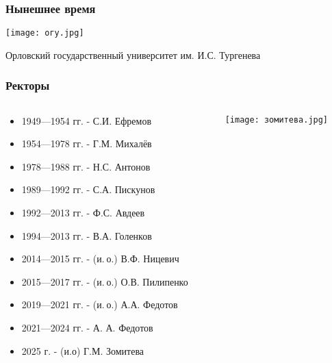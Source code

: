 \documentclass{beamer}
\begin{document}
\begin{frame}[t]
  \frametitle{Нынешнее время}
  \begin{center}
    \texttt{[image: огу.jpg]}
  \end{center}
  \vspace{-0.2em}
  \begin{center}
        \footnotesize{Орловский государственный университет им. И.С. Тургенева}
  \end{center}
\end{frame}


\begin{frame}[t]
  \frametitle{Ректоры}
  \begin{columns}[t]
    \begin{column}{0.6\textwidth}
      \small
      \raggedright
       \vspace{-3em}
      \setlength{\leftmargini}{5pt}
      \begin{itemize}
        \item 1949—1954 гг. - С.И. Ефремов
        \item 1954—1978 гг. - Г.М. Михалёв
        \item 1978—1988 гг. - Н.С. Антонов
        \item 1989—1992 гг. - С.А. Пискунов
        \item 1992—2013 гг. -  Ф.С. Авдеев
        \item 1994—2013 гг. - В.А. Голенков
        \item 2014—2015 гг. - (и. о.) В.Ф. Ницевич
        \item 2015—2017 гг. - (и. о.) О.В. Пилипенко
        \item 2019—2021 гг. - (и. о.) А.А. Федотов
        \item 2021—2024 гг. -  А. А. Федотов
        \item 2025 г. - (и.о) Г.М. Зомитева
      \end{itemize}
    \end{column}
    \begin{column}{0.4\textwidth}
      \begin{center}
      \vspace{-2em}
        \texttt{[image: зомитева.jpg]}
      \end{center}
    \end{column}
  \end{columns}
\end{frame}
\end{document}
